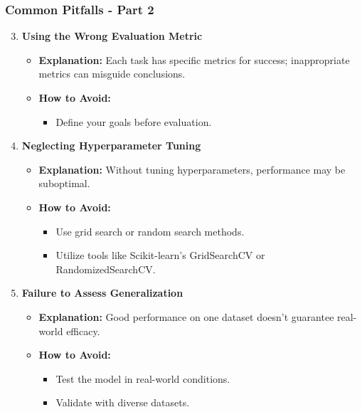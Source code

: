 \documentclass[aspectratio=169]{beamer}
\begin{document}
\begin{frame}[fragile]
    \frametitle{Common Pitfalls - Part 2}
    \begin{enumerate}
        \setcounter{enumi}{2}
        \item \textbf{Using the Wrong Evaluation Metric}
        \begin{itemize}
            \item \textbf{Explanation:} Each task has specific metrics for success; inappropriate metrics can misguide conclusions.
            \item \textbf{How to Avoid:}
            \begin{itemize}
                \item Define your goals before evaluation.
            \end{itemize}
        \end{itemize}

        \item \textbf{Neglecting Hyperparameter Tuning}
        \begin{itemize}
            \item \textbf{Explanation:} Without tuning hyperparameters, performance may be suboptimal.
            \item \textbf{How to Avoid:}
            \begin{itemize}
                \item Use grid search or random search methods.
                \item Utilize tools like Scikit-learn’s GridSearchCV or RandomizedSearchCV.
            \end{itemize}
        \end{itemize}
        
        \item \textbf{Failure to Assess Generalization}
        \begin{itemize}
            \item \textbf{Explanation:} Good performance on one dataset doesn't guarantee real-world efficacy.
            \item \textbf{How to Avoid:}
            \begin{itemize}
                \item Test the model in real-world conditions.
                \item Validate with diverse datasets.
            \end{itemize}
        \end{itemize}
    \end{enumerate}
\end{frame}
\end{document}
